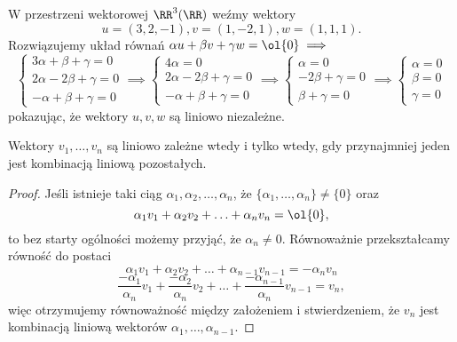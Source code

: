 \begin{example}
    W przestrzeni wektorowej $\RR^3(\RR)$ weźmy wektory
    \[ u = (3, 2, -1), v = (1, -2, 1), w = (1, 1, 1). \]
    Rozwiązujemy układ równań $\alpha u + \beta v + \gamma w = \ol{0} \implies$
    \begin{equation*}
        \begin{cases}
            3\alpha + \beta + \gamma = 0 \\
            2\alpha - 2\beta + \gamma = 0 \\
            -\alpha + \beta + \gamma = 0
        \end{cases} \implies
        \begin{cases}
            4\alpha = 0 \\
            2\alpha - 2\beta + \gamma = 0 \\
            -\alpha + \beta + \gamma = 0
        \end{cases} \implies
        \begin{cases}
            \alpha = 0 \\
            - 2\beta + \gamma = 0 \\
            \beta + \gamma = 0
        \end{cases} \implies
        \begin{cases}
            \alpha = 0 \\
            \beta = 0 \\
            \gamma = 0
        \end{cases}
    \end{equation*}
    pokazując, że wektory $u, v, w$ są liniowo niezależne.
\end{example}

\begin{theorem}
    \label{t:linear independence}
    Wektory $v_1, \ldots, v_n$ są liniowo zależne wtedy i tylko wtedy, gdy przynajmniej jeden jest kombinacją liniową pozostałych.
\end{theorem}
\begin{proof}
    Jeśli istnieje taki ciąg $\alpha_1, \alpha_2, \ldots, \alpha_n$, że $\{\alpha_1, \ldots, \alpha_n\} \neq \{0\}$ oraz
    \[ \alpha_1v_1 + \alpha_2v_2 + \ldots + \alpha_nv_n = \ol{0}, \]
    to bez starty ogólności możemy przyjąć, że $\alpha_n \neq 0$. Równoważnie przekształcamy równość do postaci
    \[ \alpha_1v_1 + \alpha_2v_2 + \ldots + \alpha_{n-1}v_{n-1} = -\alpha_nv_n \]
    \[ \frac{-\alpha_1}{\alpha_n}v_1 + \frac{-\alpha_2}{\alpha_n}v_2 + \ldots + \frac{-\alpha_{n-1}}{\alpha_n}v_{n-1} = v_n, \]
    więc otrzymujemy równoważność między założeniem i stwierdzeniem, że $v_n$ jest kombinacją liniową wektorów $\alpha_1, \ldots, \alpha_{n-1}$.
\end{proof}


